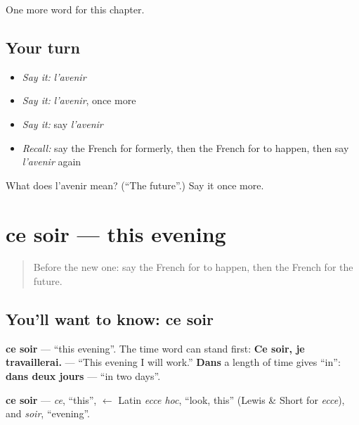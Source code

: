 \begin{grammarlens}[title={What you've built}]
One more word for this chapter.
\end{grammarlens}

\subsection*{Your turn}
\begin{itemize}
\raggedright
  \item \emph{Say it:} \emph{l'avenir}
  \item \emph{Say it:} \emph{l'avenir}, once more
  \item \emph{Say it:} say \emph{l'avenir}
  \item \emph{Recall:} say the French for formerly, then the French for to happen, then say \emph{l'avenir} again
\end{itemize}

\begin{tcolorbox}[breakable,colback=teal!4,colframe=teal!35!black,title={Before you move on}]
What does l'avenir mean? (\textquotedblleft{}The future\textquotedblright{}.) Say it once more.
\end{tcolorbox}
\section[ce soir]{ce soir — this evening}

\label{lesson:FR-C141-ce-soir}



\begin{quote}
Before the new one: say the French for to happen, then the French for the future.
\end{quote}

\subsection*{You'll want to know: ce soir}
\textbf{ce soir} — \textquotedblleft{}this evening\textquotedblright{}. The time word can stand first: \textbf{Ce soir, je travaillerai.} — \textquotedblleft{}This evening I will work.\textquotedblright{} \textbf{Dans} a length of time gives \textquotedblleft{}in\textquotedblright{}: \textbf{dans deux jours} — \textquotedblleft{}in two days\textquotedblright{}.

\begin{cousinweb}
\textbf{ce soir} — \emph{ce}, \textquotedblleft{}this\textquotedblright{}, $\leftarrow$ Latin \emph{ecce hoc}, \textquotedblleft{}look, this\textquotedblright{} (Lewis \& Short for \emph{ecce}), and \emph{soir}, \textquotedblleft{}evening\textquotedblright{}.
\end{cousinweb}

